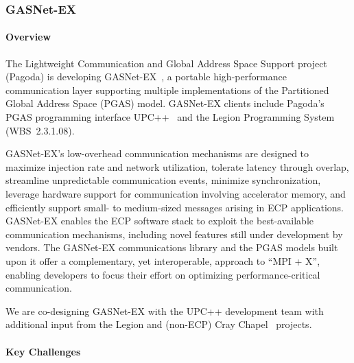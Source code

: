 \subsubsection{ GASNet-EX}\label{subsubsect:gasnet-ex}
\paragraph{Overview} 

The Lightweight Communication and Global Address Space Support project (Pagoda)
is developing GASNet-EX~\cite{gasnet-site}, a portable high-performance communication layer
supporting multiple implementations of the Partitioned Global Address Space
(PGAS) model.
GASNet-EX clients include Pagoda's PGAS programming interface UPC++~\cite{upcxx-ipdps19,upcxx-site}
 and the Legion Programming
System~\cite{bauer2012legion,legion-site} (WBS~2.3.1.08).

GASNet-EX's low-overhead communication mechanisms are designed to maximize
injection rate and network utilization, tolerate latency through
overlap, streamline unpredictable communication events, minimize
synchronization,
leverage hardware support for communication involving accelerator memory,
and efficiently support small- to medium-sized
messages arising in ECP applications.  GASNet-EX enables the ECP
software stack to exploit the best-available communication mechanisms,
including novel features still under development by vendors.  The
GASNet-EX communications library and the PGAS models built upon it
offer a complementary, yet interoperable, approach to ``MPI + X'',
enabling developers to focus their effort on optimizing
performance-critical communication.

We are co-designing GASNet-EX with the UPC++ development team with
additional input from the Legion and
(non-ECP) Cray Chapel~\cite{chapel-chapter,chapel-site} projects.

\paragraph{Key  Challenges}

